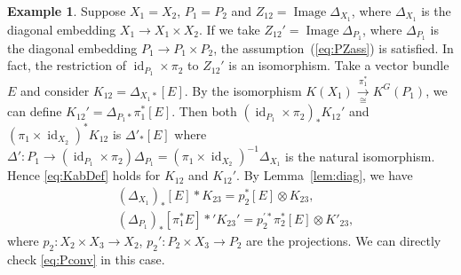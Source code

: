 \documentclass[12pt]{amsart}
\theoremstyle{definition}
\newtheorem{Example}[equation]{Example}
\theoremstyle{remark}
\numberwithin{equation}{subsection}
\newcommand{\lemref}[1]{Lemma~\ref{#1}}
\newcommand{\id}{\operatorname{id}}
\begin{document}
\begin{Example}
Suppose $X_1 = X_2$, $P_1 = P_2$ and $Z_{12} =
\operatorname{Image}\Delta_{X_1}$, where $\Delta_{X_1}$ is the
diagonal embedding $X_1\to X_1\times X_2$. If we take
$Z_{12}' = \operatorname{Image}\Delta_{P_1}$, where
$\Delta_{P_1}$ is the diagonal embedding
$P_1\to P_1\times P_2$, the assumption~(\ref{eq:PZass}) is
satisfied. In fact, the restriction of $\id_{P_1}\times\pi_2$
to $Z_{12}'$ is an isomorphism.
Take a vector bundle $E$ and consider $K_{12} = \Delta_{X_1*}[E]$.
By the isomorphism
$K(X_1) \xrightarrow[\cong]{\pi_1^*} K^G(P_1)$, we can define
$K_{12}' = \Delta_{P_1*}\pi_1^* [E]$. Then both
$(\id_{P_1}\times\pi_2)_* K_{12}'$ and $(\pi_1\times\id_{X_2})^*
K_{12}$
is $\Delta'_* [E]$ where $\Delta'\colon P_1\to 
(\id_{P_1}\times\pi_2)\Delta_{P_1} = (\pi_1\times\id_{X_2})^{-1}\Delta_{X_1}$
is the natural isomorphism. Hence \eqref{eq:KabDef} holds for $K_{12}$ 
and $K_{12}'$.
%
By \lemref{lem:diag}, we have
\begin{equation*}
\begin{split}
    & (\Delta_{X_1})_*[E] * K_{23} = p_2^* [E] \otimes K_{23},\\
  & (\Delta_{P_1})_*[\pi_1^* E] *' K_{23}'
  = p_2^{\prime*}\pi_2^* [E] \otimes K'_{23},
\end{split}
\end{equation*}
where $p_2\colon X_2\times X_3\to X_2$,
$p_2'\colon P_2\times X_3\to P_2$
are the projections. We can directly check \eqref{eq:Pconv} in this case.
\end{Example}
\end{document}
